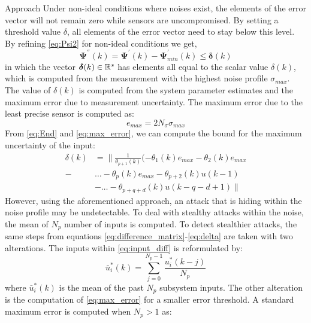 \begin{section}{Approach}
Under non-ideal conditions where noises exist, the elements of the error vector will not remain zero while sensors are uncompromised. By setting a threshold value $\delta$, all elements of the error vector need to stay below this level. By refining \eqref{eq:Psi2} for non-ideal conditions we get,
    \begin{equation}
    \label{eq:Psi2_nonideal}
	\bm{\Psi^{''}}(k)=\bm{\Psi^{'}}(k)-\bm{\Psi}^{'}_{min}(k) \leq \bm{\delta}(k)
	\end{equation}
in which the vector $\bm{\delta}(k) \in \mathbb{R}^s$ has elements all equal to the scalar value $\delta(k)$, which is computed from the measurement with the highest noise profile $\sigma_{max}$. The value of $\delta(k)$ is computed from the system parameter estimates and the maximum error due to measurement uncertainty. The maximum error due to the least precise sensor is computed as:
	\begin{equation}
	    \label{eq:max_error}
	    e_{max} = 2N_{\sigma}\sigma_{max}
	\end{equation}
From \eqref{eq:End} and \eqref{eq:max_error}, we can compute the bound for the maximum uncertainty of the input:
\begin{align}
	\label{eq:delta}
	\delta(k) &= \lVert{ \frac{1}{\theta_{p+1}(k)}(-\theta_1(k)e_{max}-\theta_2(k)e_{max} } \nonumber \\
    -& \dots-\theta_p(k)e_{max}-\theta_{p+2}(k)u(k-1)  \\
	& - \dots- \theta_{p+q+d}(k)u(k-q-d+1) \rVert  \nonumber
	\end{align}
However, using the aforementioned approach, an attack that is hiding within the noise profile may be undetectable. To deal with stealthy attacks within the noise, the mean of $N_p$ number of inputs is computed. To detect stealthier attacks, the same steps from equations \eqref{eq:difference_matrix}-\eqref{eq:delta} are taken with two alterations. The inputs within \eqref{eq:input_diff} is reformulated by:
    \begin{equation}
        \label{eq:Average_input}
        \bar{u}^*_i(k) = \sum_{j=0}^{N_p-1} \frac{u^*_i(k-j)}{N_p}
    \end{equation}
where $\bar{u}^*_i(k)$ is the mean of the past $N_p$ subsystem inputs. The other alteration is the computation of \eqref{eq:max_error} for a smaller error threshold. A standard maximum error is computed when $N_p>1$ as:

\end{section}
